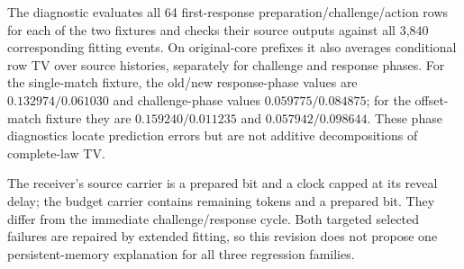 
The diagnostic evaluates all 64 first-response preparation/challenge/action rows for each of the two fixtures and checks their source outputs against all 3,840 corresponding fitting events. On original-core prefixes it also averages conditional row TV over source histories, separately for challenge and response phases. For the single-match fixture, the old/new response-phase values are $0.132974/0.061030$ and challenge-phase values $0.059775/0.084875$; for the offset-match fixture they are $0.159240/0.011235$ and $0.057942/0.098644$. These phase diagnostics locate prediction errors but are not additive decompositions of complete-law TV.

The receiver's source carrier is a prepared bit and a clock capped at its reveal delay; the budget carrier contains remaining tokens and a prepared bit. They differ from the immediate challenge/response cycle. Both targeted selected failures are repaired by extended fitting, so this revision does not propose one persistent-memory explanation for all three regression families.


\FloatBarrier
\clearpage
\printbibliography[heading=bibintoc]

